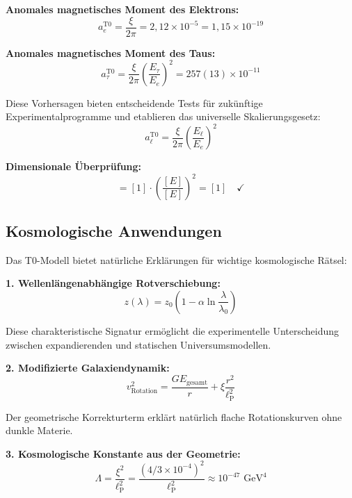 \documentclass[12pt,a4paper]{report}
\newcommand{\lP}{\ell_{\text{P}}}         %
\begin{document}
	\textbf{Anomales magnetisches Moment des Elektrons:}
	\begin{equation}
		a_e^{\text{T0}} = \frac{\xi}{2\pi} = 2,12 \times 10^{-5} = 1,15 \times 10^{-19}
	\end{equation}
	
	\textbf{Anomales magnetisches Moment des Taus:}
	\begin{equation}
		a_\tau^{\text{T0}} = \frac{\xi}{2\pi} \left(\frac{E_\tau}{E_e}\right)^2 = 257(13) \times 10^{-11}
	\end{equation}
	
	Diese Vorhersagen bieten entscheidende Tests für zukünftige Experimentalprogramme und etablieren das universelle Skalierungsgesetz:
	\begin{equation}
		a_\ell^{\text{T0}} = \frac{\xi}{2\pi} \left(\frac{E_\ell}{E_e}\right)^2
	\end{equation}
	
	\textbf{Dimensionale Überprüfung:}
	\begin{equation}
		[a_\ell] = [1] \cdot \left(\frac{[E]}{[E]}\right)^2 = [1] \quad \checkmark
	\end{equation}
	
	\subsection{Kosmologische Anwendungen}
	\label{subsec:cosmological_applications}
	
	Das T0-Modell bietet natürliche Erklärungen für wichtige kosmologische Rätsel:
	
	\textbf{1. Wellenlängenabhängige Rotverschiebung:}
	\begin{equation}
		z(\lambda) = z_0\left(1 - \alpha \ln\frac{\lambda}{\lambda_0}\right)
	\end{equation}
	
	Diese charakteristische Signatur ermöglicht die experimentelle Unterscheidung zwischen expandierenden und statischen Universumsmodellen.
	
	\textbf{2. Modifizierte Galaxiendynamik:}
	\begin{equation}
		v_{\text{Rotation}}^2 = \frac{GE_{\text{gesamt}}}{r} + \xi \frac{r^2}{\lP^2}
	\end{equation}
	
	Der geometrische Korrekturterm erklärt natürlich flache Rotationskurven ohne dunkle Materie.
	
	\textbf{3. Kosmologische Konstante aus der Geometrie:}
	\begin{equation}
		\Lambda = \frac{\xi^2}{\lP^2} = \frac{(4/3 \times 10^{-4})^2}{\lP^2} \approx 10^{-47} \text{ GeV}^4
	\end{equation}
	
\end{document}
